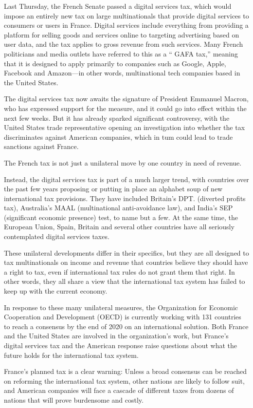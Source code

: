 Last Thursday, the French Senate passed a digital services tax, which would impose an entirely new tax on large multinationals that provide digital services to consumers or users in France. Digital services include everything from providing a platform for selling goods and services online to targeting advertising based on user  data, and the tax applies to gross revenue from such services. Many French politicians and media outlets have referred to this as a `` GAFA tax,'' meaning that it is designed    to apply primarily to companies such as Google, Apple, Facebook and Amazon—in other words, multinational tech companies based in the United States.


The digital services tax now awaits the signature of President Emmanuel Macron, who has expressed support for the measure, and it could go into effect within the next few weeks. But it has already sparked significant controversy, with the United States trade representative opening an investigation into whether the tax discriminates against American companies, which in tum could lead to trade sanctions against France.


The French tax is not just a unilateral move by one country in need of revenue.


Instead, the digital services tax is part of a much larger trend, with countries over the past few years proposing or putting in place an alphabet soup of new international tax provisions. They have included Britain's DPT. (diverted profits tax), Australia's MAAL (multinational anti-avoidance law), and India's SEP (significant economic   presence) test, to name but a few. At the same time, the European Union, Spain, Britain and several other countries have all seriously contemplated digital services taxes.


These unilateral developments differ in their specifics, but they are all designed   to tax multinationals on income and revenue that countries believe they should have a right to tax, even if international tax rules do not grant them that right. In other words, they all share a view that the international tax system has failed to keep up with the current economy.


In response to these many unilateral measures, the Organization for Economic Cooperation and Development (OECD) is currently working with 131 countries to reach a consensus by the end of 2020 on an international solution. Both France and   the United States are involved in the organization's work, but France's digital services tax and the American response raise questions about what the future holds for the international tax system.


France's planned tax is a clear warning: Unless a broad consensus can be  reached on reforming the international tax system, other nations are likely to follow  suit, and American companies will face a cascade of different taxes from dozens of nations that will prove burdensome and costly.


